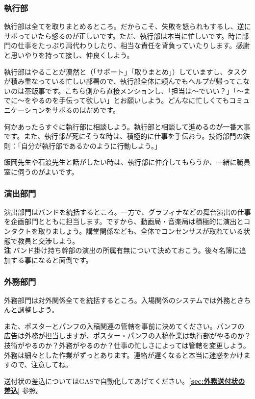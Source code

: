 \documentclass[dvipdfmx,jb5]{jarticle}
\begin{document}
\subsubsection{執行部}
執行部は全てを取りまとめるところ。だからこそ、失敗を怒られもするし、逆にサボっていたら怒るのが正しいです。ただ、執行部は本当に忙しいです。時に部門の仕事をたっぷり肩代わりしたり、相当な責任を背負っていたりします。感謝と思いやりを持って接し、仲良くしよう。

執行部はやることが漠然と（「サポート」「取りまとめ」）していますし、タスクが積み重なっている忙しい部署ので、執行部全体に頼んでもヘルプが帰ってこないのは茶飯事です。こちら側から直接メンションし、「担当は〜でいい？」「〜までに〜をやるのを手伝って欲しい」とお願いしよう。どんなに忙しくてもコミュニケーションをサボるのはだめです。

何かあったらすぐに執行部に相談しよう。執行部と相談して進めるのが一番大事です。また、執行部が死にそうな時は、積極的に仕事を手伝おう。技術部門の鉄則：「自分が執行部であるかのように行動しよう。」

飯岡先生や石渡先生と話がしたい時は、執行部に仲介してもらうか、一緒に職員室に伺うのがよいです。

\subsubsection{演出部門}\label{sec:演出部門}
演出部門はバンドを統括するところ。一方で、グラフィナなどの舞台演出の仕事を企画部門とともに担当します。ですから、動画局・音楽局は積極的に演出とコンタクトを取りましょう。講堂関係なども、全体でコンセンサスが取れている状態で教員と交渉しよう。\\
{\bf 注} バンド掛け持ち幹部の演出の所属有無について決めておこう。後々名簿に追加する事になると面倒です。

\subsubsection{外務部門}
外務部門は対外関係全てを統括するところ。入場関係のシステムでは外務ときちんと調整しよう。

また、ポスターとパンフの入稿関連の管轄を事前に決めてください。パンフの広告は外務が担当しますが、ポスター・パンフの入稿作業は執行部がやるのか？技術がやるのか？外務がやるのか？仕事の忙しさによっては管轄を変更しよう。外務は細々とした作業がずっとあります。連絡が遅くなると本当に迷惑をかけますので、注意してね。

送付状の差込についてはGASで自動化してあげてください。{\bf \ref{sec:外務送付状の差込}} 参照。
\end{document}
